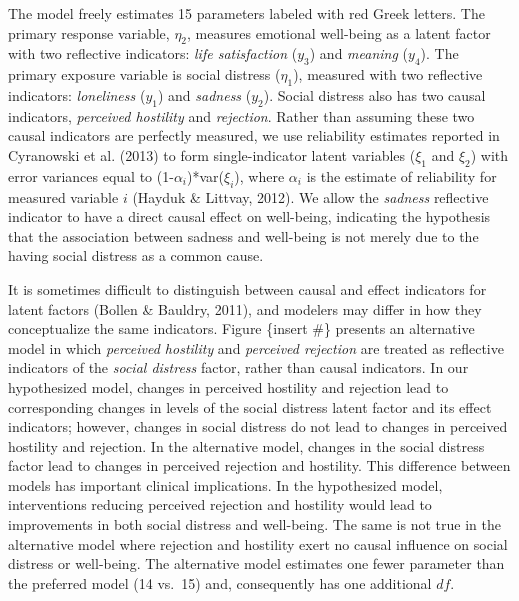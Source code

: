 \documentclass[
  english,
  doc]{apa6}
\begin{document}
The model freely estimates 15 parameters labeled with red Greek letters. The primary response variable, \(\eta_{2}\), measures emotional well-being as a latent factor with two reflective indicators: \emph{life satisfaction} (\(y_3\)) and \emph{meaning} (\(y_4\)). The primary exposure variable is social distress (\(\eta_{1}\)), measured with two reflective indicators: \emph{loneliness} (\(y_1\)) and \emph{sadness} (\(y_2\)). Social distress also has two causal indicators, \emph{perceived hostility} and \emph{rejection}. Rather than assuming these two causal indicators are perfectly measured, we use reliability estimates reported in Cyranowski et al. (2013) to form single-indicator latent variables (\(\xi_1\) and \(\xi_2\)) with error variances equal to (1-\(\alpha_i\))*var(\(\xi_i\)), where \(\alpha_i\) is the estimate of reliability for measured variable \(i\) (Hayduk \& Littvay, 2012). We allow the \emph{sadness} reflective indicator to have a direct causal effect on well-being, indicating the hypothesis that the association between sadness and well-being is not merely due to the having social distress as a common cause.

It is sometimes difficult to distinguish between causal and effect indicators for latent factors (Bollen \& Bauldry, 2011), and modelers may differ in how they conceptualize the same indicators. Figure \{insert \#\} presents an alternative model in which \emph{perceived hostility} and \emph{perceived rejection} are treated as reflective indicators of the \emph{social distress} factor, rather than causal indicators. In our hypothesized model, changes in perceived hostility and rejection lead to corresponding changes in levels of the social distress latent factor and its effect indicators; however, changes in social distress do not lead to changes in perceived hostility and rejection. In the alternative model, changes in the social distress factor lead to changes in perceived rejection and hostility. This difference between models has important clinical implications. In the hypothesized model, interventions reducing perceived rejection and hostility would lead to improvements in both social distress and well-being. The same is not true in the alternative model where rejection and hostility exert no causal influence on social distress or well-being. The alternative model estimates one fewer parameter than the preferred model (14 vs.~15) and, consequently has one additional \(df\).
\end{document}
